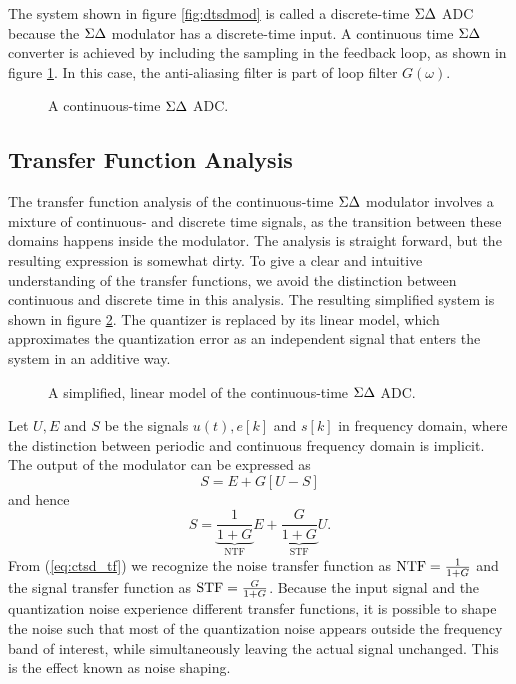 The system shown in figure \ref{fig:dtsdmod} is called a discrete-time $\Sigma\Delta$ ADC because the $\Sigma\Delta$ modulator has a discrete-time input. A continuous time $\Sigma\Delta$ converter is achieved by including the sampling in the feedback loop, as shown in figure \ref{fig:ctsdmod}. In this case, the anti-aliasing filter is part of loop filter $G(\omega)$.

\begin{figure}[htbp]
    
    \centering
    \caption{A continuous-time $\Sigma\Delta$ ADC.}
    \label{fig:ctsdmod}
\end{figure}

\subsection{Transfer Function Analysis}
\label{sec:ctsd_tf_analysis}
The transfer function analysis of the continuous-time $\Sigma\Delta$ modulator involves a mixture of continuous- and discrete time signals, as the transition between these domains happens inside the modulator. The analysis is straight forward, but the resulting expression is somewhat dirty. To give a clear and intuitive understanding of the transfer functions, we avoid the distinction between continuous and discrete time in this analysis. The resulting simplified system is shown in figure \ref{fig:ctsdmod_lin}. The quantizer is replaced by its linear model, which approximates the quantization error as an independent signal that enters the system in an additive way.
\begin{figure}[htbp]
    
    \centering
    \caption{A simplified, linear model of the continuous-time $\Sigma\Delta$ ADC.}
    \label{fig:ctsdmod_lin}
\end{figure}

Let $U, E$ and $S$ be the signals $u(t), e[k]$ and $s[k]$ in frequency domain, where the distinction between periodic and continuous frequency domain is implicit. The output of the modulator can be expressed as
\begin{equation}
    S = E + G[U - S]
\end{equation}
and hence
\begin{equation}
    \label{eq:ctsd_tf}
    S = \underbrace{\frac{1}{1+G}}_\text{NTF}E + \underbrace{\frac{G}{1 + G}}_\text{STF}U.
\end{equation}
From (\ref{eq:ctsd_tf}) we recognize the noise transfer function as $\text{NTF} = \frac{1}{1+G}$ and the signal transfer function as $\text{STF} = \frac{G}{1 + G}$. Because the input signal and the quantization noise experience different transfer functions, it is possible to shape the noise such that most of the quantization noise appears outside the frequency band of interest, while simultaneously leaving the actual signal unchanged. This is the effect known as noise shaping.
